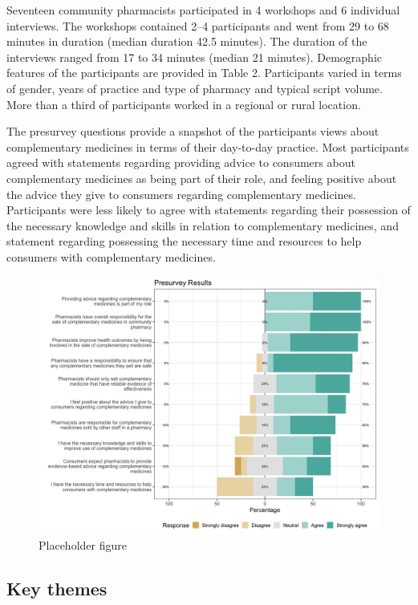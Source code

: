 \documentclass[11pt,a4paper]{article}
\begin{document}
Seventeen community pharmacists participated in 4 workshops and 6
individual interviews. The workshops contained 2--4 participants and
went from 29 to 68 minutes in duration (median duration 42.5 minutes).
The duration of the interviews ranged from 17 to 34 minutes (median 21
minutes). Demographic features of the participants are provided in Table
2. Participants varied in terms of gender, years of practice and type of
pharmacy and typical script volume. More than a third of participants
worked in a regional or rural location.



The presurvey questions provide a snapshot of the participants views
about complementary medicines in terms of their day-to-day practice.
Most participants agreed with statements regarding providing advice to
consumers about complementary medicines as being part of their role, and
feeling positive about the advice they give to consumers regarding
complementary medicines. Participants were less likely to agree with
statements regarding their possession of the necessary knowledge and
skills in relation to complementary medicines, and statement regarding
possessing the necessary time and resources to help consumers with
complementary medicines.

\begin{figure}
\centering
\includegraphics{fig_tab/presurvey.png}
\caption{Placeholder figure}
\end{figure}

\subsection{Key themes}\label{key-themes}
\end{document}
